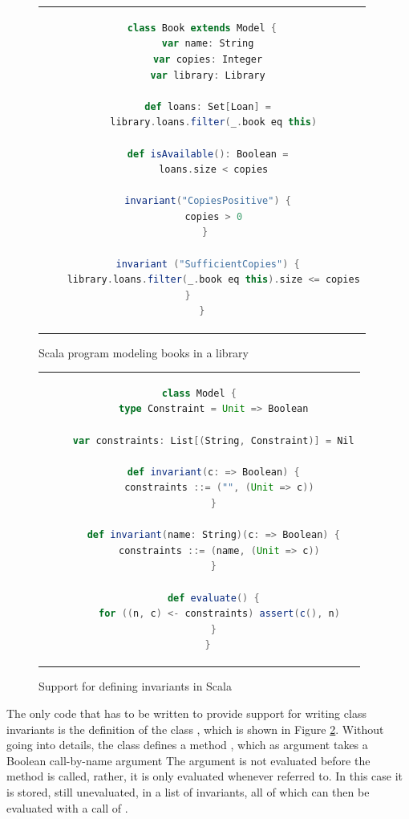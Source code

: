 \begin{figure}
\begin{center}
\begin{tabular}{c}
\begin{lstlisting}[language=scala]
class Book extends Model {
  var name: String
  var copies: Integer
  var library: Library

  def loans: Set[Loan] =
    library.loans.filter(_.book eq this)

  def isAvailable(): Boolean =
    loans.size < copies
      
  invariant("CopiesPositive") {
    copies > 0
  } 
       
  invariant ("SufficientCopies") {
    library.loans.filter(_.book eq this).size <= copies
  }       
}
\end{lstlisting}
\end{tabular}
\end{center}
\caption{Scala program modeling books in a library}
\label{fig:book-scala}
\end{figure}

\begin{figure}[htb]
\begin{center}
\begin{tabular}{c}
\begin{lstlisting}[language=scala]
   class Model {
     type Constraint = Unit => Boolean

     var constraints: List[(String, Constraint)] = Nil

     def invariant(c: => Boolean) {
       constraints ::= ("", (Unit => c))
     }

     def invariant(name: String)(c: => Boolean) {
       constraints ::= (name, (Unit => c))
     }

     def evaluate() {
       for ((n, c) <- constraints) assert(c(), n)
     }
   }
\end{lstlisting}
\end{tabular}
\end{center}
\label{fig:invariant-scala}
\caption{Support for defining invariants in Scala}
\end{figure}

The only code that has to be written to provide support for 
writing
class invariants is the definition of the class , 
which is shown in Figure \ref{fig:invariant-scala}. Without going 
into details, the class defines a method ,
which as argument takes a Boolean call-by-name argument 
The argument is not evaluated before the method is called, 
rather, it is only evaluated whenever referred to. In this case
it is stored, still unevaluated, in a list of invariants, all
of which can then be evaluated with a call of .


